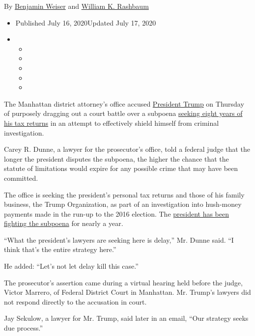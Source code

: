 By \href{https://www.nytimes.com/by/benjamin-weiser}{Benjamin Weiser}
and \href{https://www.nytimes.com/by/william-k-rashbaum}{William K.
Rashbaum}

\begin{itemize}
\item
  Published July 16, 2020Updated July 17, 2020
\item
  \begin{itemize}
  \item
  \item
  \item
  \item
  \item
  \end{itemize}
\end{itemize}

The Manhattan district attorney's office accused
\href{https://www.nytimes.com/2019/07/29/nyregion/trump-sharpton-ny-history.html}{President
Trump} on Thursday of purposely dragging out a court battle over a
subpoena
\href{https://www.nytimes.com/2020/08/03/nyregion/donald-trump-taxes-cyrus-vance.html}{seeking
eight years of his tax returns} in an attempt to effectively shield
himself from criminal investigation.

Carey R. Dunne, a lawyer for the prosecutor's office, told a federal
judge that the longer the president disputes the subpoena, the higher
the chance that the statute of limitations would expire for any possible
crime that may have been committed.

The office is seeking the president's personal tax returns and those of
his family business, the Trump Organization, as part of an investigation
into hush-money payments made in the run-up to the 2016 election. The
\href{https://www.nytimes.com/2020/07/09/us/politics/trump-taxes.html}{president
has been fighting the subpoena} for nearly a year.

``What the president's lawyers are seeking here is delay,'' Mr. Dunne
said. ``I think that's the entire strategy here.''

He added: ``Let's not let delay kill this case.''

The prosecutor's assertion came during a virtual hearing held before the
judge, Victor Marrero, of Federal District Court in Manhattan. Mr.
Trump's lawyers did not respond directly to the accusation in court.

Jay Sekulow, a lawyer for Mr. Trump, said later in an email, ``Our
strategy seeks due process.''

